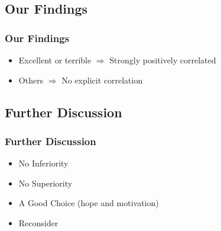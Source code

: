 \subsection{Our Findings}
\begin{frame}
    \frametitle{Our Findings}
    \LARGE
    \begin{itemize}
        \item Excellent or terrible $\Rightarrow$ Strongly positively correlated \label{itm:Findings}
        \item Others $\Rightarrow$ No explicit correlation
    \end{itemize}
\end{frame}

\subsection{Further Discussion}
\begin{frame}
    \frametitle{Further Discussion}
    \LARGE
    \begin{itemize}[<+->]
        \item No Inferiority
        \item No Superiority
        \item A Good Choice (hope and motivation)
        \item Reconsider
    \end{itemize}
\end{frame}